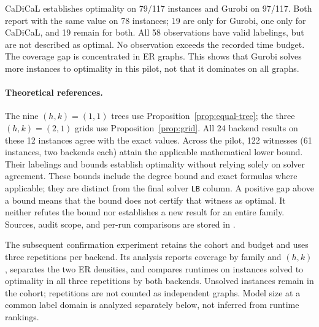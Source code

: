 \begin{table}[H]
\caption{Pilot optimality coverage.}
\centering\small


\label{tab:general-pilot}
\end{table}
CaDiCaL establishes optimality on 79/117 instances and Gurobi on 97/117.
Both report \OPT{} with the same value on 78 instances; 19 are \OPT{} only
for Gurobi, one only for CaDiCaL, and 19 remain \FEAS{} for both. All 58
\FEAS{} observations have valid labelings, but are not described as optimal.
No \OPT{} observation exceeds the recorded time budget. The coverage gap
is concentrated in ER graphs. This shows that Gurobi solves more instances
to optimality in this pilot, not that it dominates on all graphs.

\paragraph{Theoretical references.}
The nine $(h,k)=(1,1)$ trees use Proposition~\ref{prop:equal-tree}; the three
$(h,k)=(2,1)$ grids use Proposition~\ref{prop:grid}. All 24 backend results
on these 12 instances agree with the exact values. Across the pilot,
122 witnesses (61 instances, two backends each) attain the applicable
mathematical lower bound. Their labelings and bounds establish optimality
without relying solely on solver agreement. These bounds include the degree
bound and exact formulas where applicable; they are distinct from the final
solver \texttt{LB} column. A positive gap above a bound means that the bound
does not certify that witness as optimal. It neither refutes the bound nor
establishes a new result for an entire family. Sources, audit scope, and
per-run comparisons are stored in .

The subsequent confirmation experiment retains the cohort and budget and
uses three repetitions per backend. Its analysis reports coverage by family
and $(h,k)$, separates the two ER densities, and compares runtimes on instances
solved to optimality in all three repetitions by both backends. Unsolved
instances remain in the cohort; repetitions are not counted as independent
graphs. Model size at a common label domain is analyzed separately below,
not inferred from runtime rankings.

